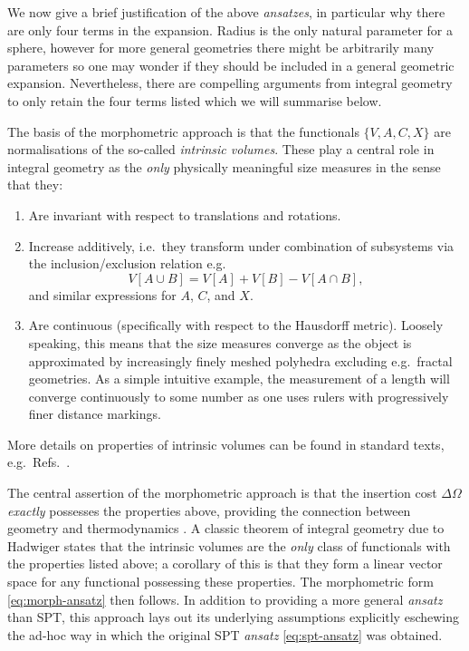 \documentclass[11pt,twoside]{report}
\begin{document}
We now give a brief justification of the above \emph{ansatzes}, in particular why there are only four terms in the expansion.
Radius is the only natural parameter for a sphere, however for more general geometries there might be arbitrarily many parameters so one may wonder if they should be included in a general geometric expansion.
Nevertheless, there are compelling arguments from integral geometry \cite{KonigPRL2004} to only retain the four terms listed which we will summarise below.

The basis of the morphometric approach is that the functionals $\{V,A,C,X\}$ are normalisations of the so-called \emph{intrinsic volumes}.
These play a central role in integral geometry as the \emph{only} physically meaningful size measures in the sense that they:
\begin{enumerate}
\item Are invariant with respect to translations and rotations.
\item Increase additively, i.e.\ they transform under combination of subsystems via the inclusion/exclusion relation e.g.\
  \begin{equation*}\label{eq:additivity}
    V[A \cup B] = V[A] + V[B] - V[A \cap B],
  \end{equation*}
  and similar expressions for $A$, $C$, and $X$.
\item Are continuous (specifically with respect to the Hausdorff metric).
  Loosely speaking, this means that the size measures converge as the object is approximated by increasingly finely meshed polyhedra excluding e.g.\ fractal geometries.
  As a simple intuitive example, the measurement of a length will converge continuously to some number as one uses rulers with progressively finer distance markings.
\end{enumerate}
More details on properties of intrinsic volumes can be found in standard texts, e.g.\ Refs.\ \cite{Santalo2004,Klain1997}.

The central assertion of the morphometric approach is that the insertion cost $\Delta \Omega$ \emph{exactly} possesses the properties above, providing the connection between geometry and thermodynamics \cite{KonigPRL2004}.
A classic theorem of integral geometry due to Hadwiger \cite{Hadwiger1957} states that the intrinsic volumes are the \emph{only} class of functionals with the properties listed above; a corollary of this is that they form a linear vector space for any functional possessing these properties.
The morphometric form \eqref{eq:morph-ansatz} then follows.
In addition to providing a more general \emph{ansatz} than SPT, this approach lays out its underlying assumptions explicitly eschewing the ad-hoc way in which the original SPT \emph{ansatz} \eqref{eq:spt-ansatz} was obtained.
\end{document}
